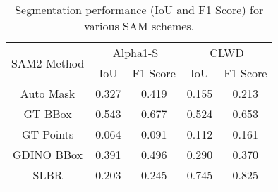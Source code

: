 
\begin{table}[t]
\caption{Segmentation performance (IoU and F1 Score) for various SAM schemes. }
\label{tab:eval_sam}
\vskip 0.1in
\begin{center}
\begin{small}
\begin{sc}
\begin{tabular}{c|cc|cc}
\toprule
 \multirow{2}{*}{SAM2 Method} &  \multicolumn{2}{c|}{Alpha1-S} & \multicolumn{2}{c}{CLWD} \\ 
 \cline{2-5}
  & IoU & F1 Score & IoU & F1 Score \\
 \midrule
 Auto Mask & 0.327 & 0.419 & 0.155 & 0.213 \\
 GT BBox & \cellcolor{green!30}0.543 & \cellcolor{green!30}0.677 & 0.524 & 0.653 \\
 GT Points & 0.064 & 0.091 & 0.112 & 0.161 \\
 GDINO BBox & 0.391 & 0.496 & 0.290 & 0.370 \\
 SLBR & 0.203 & 0.245 & \cellcolor{green!30}0.745 &  \cellcolor{green!30}0.825\\
 
\bottomrule
\end{tabular}
\end{sc}
\end{small}
\end{center}
\vskip -0.1in
\end{table} 
